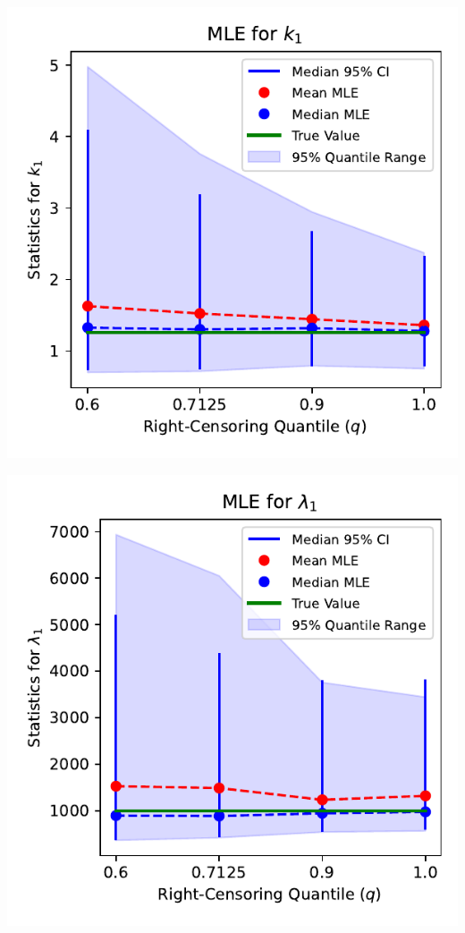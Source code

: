\documentclass{article}
\begin{document}
\pagestyle{empty}

\noindent
\begin{minipage}[t]{0.475\textwidth}
  \centering
  \includegraphics[width=\textwidth,height=0.33\textheight,keepaspectratio]{plot-q-vs-shape.1-mle.pdf}
\end{minipage}%
\begin{minipage}[t]{0.475\textwidth}
  \centering
  \includegraphics[width=\textwidth,height=0.33\textheight,keepaspectratio]{plot-q-vs-scale.1-mle.pdf}
\end{minipage}
\end{document}
